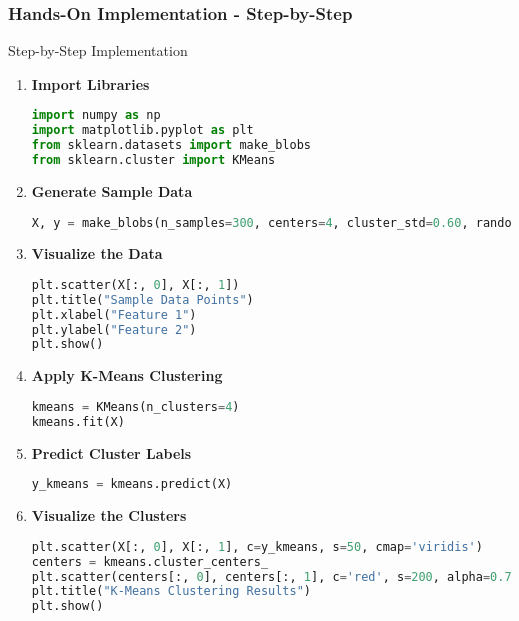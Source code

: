 \documentclass[aspectratio=169]{beamer}
\begin{document}
\begin{frame}[fragile]
    \frametitle{Hands-On Implementation - Step-by-Step}
    \begin{block}{Step-by-Step Implementation}
        \begin{enumerate}
            \item \textbf{Import Libraries}
            \begin{lstlisting}[language=Python]
import numpy as np
import matplotlib.pyplot as plt
from sklearn.datasets import make_blobs
from sklearn.cluster import KMeans
            \end{lstlisting}

            \item \textbf{Generate Sample Data}
            \begin{lstlisting}[language=Python]
X, y = make_blobs(n_samples=300, centers=4, cluster_std=0.60, random_state=0)
            \end{lstlisting}

            \item \textbf{Visualize the Data}
            \begin{lstlisting}[language=Python]
plt.scatter(X[:, 0], X[:, 1])
plt.title("Sample Data Points")
plt.xlabel("Feature 1")
plt.ylabel("Feature 2")
plt.show()
            \end{lstlisting}
            
            \item \textbf{Apply K-Means Clustering}
            \begin{lstlisting}[language=Python]
kmeans = KMeans(n_clusters=4)
kmeans.fit(X)
            \end{lstlisting}

            \item \textbf{Predict Cluster Labels}
            \begin{lstlisting}[language=Python]
y_kmeans = kmeans.predict(X)
            \end{lstlisting}
            
            \item \textbf{Visualize the Clusters}
            \begin{lstlisting}[language=Python]
plt.scatter(X[:, 0], X[:, 1], c=y_kmeans, s=50, cmap='viridis')
centers = kmeans.cluster_centers_
plt.scatter(centers[:, 0], centers[:, 1], c='red', s=200, alpha=0.75, marker='X')
plt.title("K-Means Clustering Results")
plt.show()
            \end{lstlisting}
        \end{enumerate}
    \end{block}
\end{frame}
\end{document}
